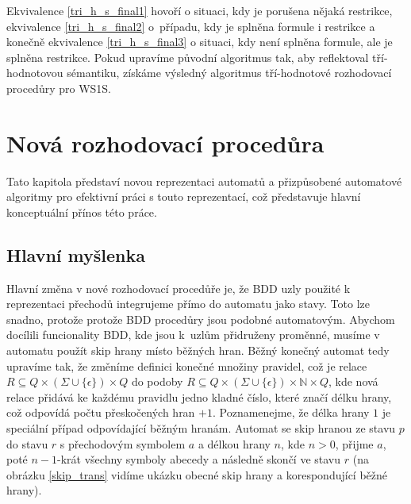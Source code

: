 Ekvivalence \ref{tri_h_s_final1} hovoří o situaci, kdy je porušena nějaká restrikce, ekvivalence \ref{tri_h_s_final2} o~případu, kdy je splněna formule i restrikce a konečně ekvivalence \ref{tri_h_s_final3} o situaci, kdy není splněna formule, ale je splněna restrikce. Pokud upravíme původní algoritmus tak, aby reflektoval tří-hodnotovou sémantiku, získáme výsledný algoritmus tří-hodnotové rozhodovací procedůry pro WS1S.

\chapter{Nová rozhodovací procedůra}
\label{2_nova_roz_proc}

Tato kapitola představí novou reprezentaci automatů a přizpůsobené automatové algoritmy pro efektivní práci s touto reprezentací, což představuje hlavní konceptuální přínos této práce.

\section{Hlavní myšlenka}

Hlavní změna v nové rozhodovací procedůře je, že BDD uzly použité k reprezentaci přechodů integrujeme přímo do automatu jako stavy. Toto lze snadno, protože protože BDD procedůry jsou podobné automatovým. Abychom docílili funcionality BDD, kde jsou k~uzlům přidruženy proměnné, musíme v automatu použít skip hrany místo běžných hran. Běžný konečný automat tedy upravíme tak, že změníme definici konečné množiny pravidel, což je relace $R \subseteq Q \times (\Sigma \cup \{ \epsilon \}) \times Q $ do podoby $R \subseteq Q \times (\Sigma \cup \{ \epsilon \}) \times \mathbb{N} \times Q$, kde nová relace přidává ke každému pravidlu jedno kladné číslo, které značí délku hrany, což odpovídá počtu přeskočených hran $+ 1$. Poznamenejme, že délka hrany $1$ je speciální případ odpovídající běžným hranám. Automat se skip hranou ze stavu $p$ do stavu $r$ s přechodovým symbolem $a$ a délkou hrany $n$, kde $n>0$, přijme $a$, poté $n-1$-krát všechny symboly abecedy a následně skončí ve stavu $r$ (na obrázku \ref{skip_trans} vidíme ukázku obecné skip hrany a korespondující běžné hrany).

